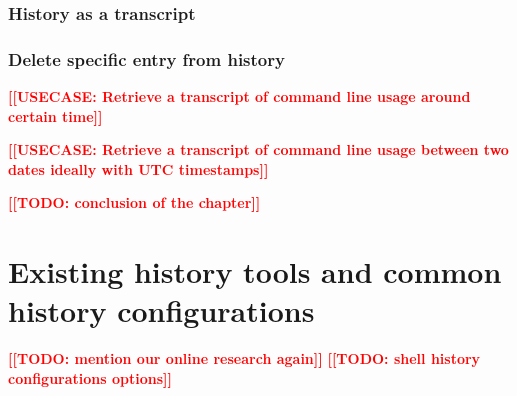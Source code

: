\documentclass[thesis=M,english]{FITthesis}[2012/10/20]
\newcommand{\todotext}[1]{\textcolor{red}{\textbf{[[#1]]}}}
\begin{document}






\subsubsection*{History as a transcript}

\subsubsection*{Delete specific entry from history}

\todotext{USECASE: Retrieve a transcript of command line usage around certain time}

\todotext{USECASE: Retrieve a transcript of command line usage between two dates ideally with UTC timestamps}







\todotext{TODO: conclusion of the chapter}


\section{Existing history tools and common history configurations}

\todotext{TODO: mention our online research again}
\todotext{TODO: shell history configurations options}
\end{document}
